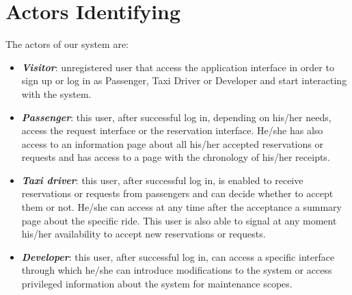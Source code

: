 \chapter{Actors Identifying} \label{chap2}

The actors of our system are:
\begin{itemize}
	\item \textbf{\textit{Visitor}}: unregistered user that access the application interface in order to sign up or log in as Passenger, Taxi Driver or Developer and start interacting with the system.
	\item \textbf{\textit{Passenger}}: this user, after successful log in, depending on his/her needs, access the request interface or the reservation interface. He/she has also access to an information page about all his/her accepted reservations or requests and has access to a page with the chronology of his/her receipts.
	\item \textbf{\textit{Taxi driver}}: this user, after successful log in, is enabled to receive reservations or requests from passengers and can decide whether to accept them or not. He/she can access at any time after the acceptance a summary page about the specific ride. This user is also able to signal at any moment his/her availability to accept new reservations or requests.
	\item \textbf{\textit{Developer}}: this user, after successful log in, can access a specific interface through which he/she can introduce modifications to the system or access privileged information about the system for maintenance scopes.
\end{itemize}